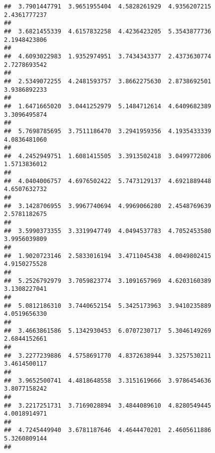 \documentclass[]{article}
\begin{document}
\begin{verbatim}
##  3.7901447791  3.9651955404  4.5828261929  4.9356207215  2.4361777237 
##                                                                       
##  3.6821455339  4.6157832258  4.4236423205  5.3543877736  2.1948423806 
##                                                                       
##  4.6093022983  1.9352974951  3.7434343377  2.4373630774  2.7278693542 
##                                                                       
##  2.5349072255  4.2481593757  3.8662275630  2.8738692501  3.9386892233 
##                                                                       
##  1.6471665020  3.0441252979  5.1484712614  4.6409682389  3.3096495874 
##                                                                       
##  5.7698785695  3.7511186470  3.2941959356  4.1935433339  4.0836481060 
##                                                                       
##  4.2452949751  1.6081415505  3.3913502418  3.0499772806  1.5713836012 
##                                                                       
##  4.0404006757  4.6976502422  5.7473129137  4.6921889448  4.6507632732 
##                                                                       
##  3.1428706955  3.9967740694  4.9969066280  2.4548769639  2.5781182675 
##                                                                       
##  3.5990373355  3.3319947749  4.0494537783  4.7052453580  3.9956039809 
##                                                                       
##  1.9020723146  2.5833016194  3.4711045438  4.0049802415  4.9150275528 
##                                                                       
##  5.2526792979  3.7059823774  3.1091657969  4.6203160389  3.1308227041 
##                                                                       
##  5.0812186310  3.7440652154  5.3425173963  3.9410235889  4.0519656330 
##                                                                       
##  3.4663861586  5.1342930453  6.0707230717  5.3046149269  2.6844152661 
##                                                                       
##  3.2277239886  4.5758691770  4.8372638944  3.3257530211  3.4614500117 
##                                                                       
##  3.9652500741  4.4818648558  3.3151619666  3.9786454636  3.8077158242 
##                                                                       
##  3.2217251731  3.7169028894  3.4844089610  4.8280549445  4.0018914971 
##                                                                       
##  4.7245449940  3.6781187646  4.4644470201  2.4605611886  5.3260809144 
##                                                                       

\end{verbatim}
\end{document}
